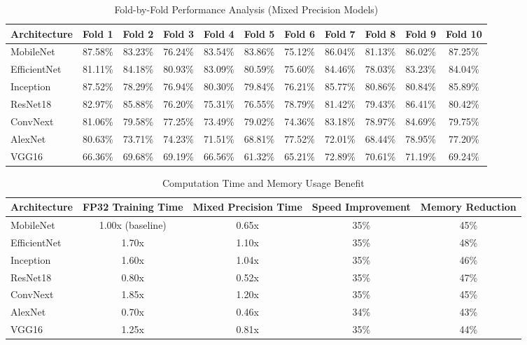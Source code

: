 \documentclass[11pt]{article}
\begin{document}
\begin{table}[ht]
    \centering
    \small
    \begin{tabular}{lcccccccccc}
    \toprule
    \textbf{Architecture} & \textbf{Fold 1} & \textbf{Fold 2} & \textbf{Fold 3} & \textbf{Fold 4} & \textbf{Fold 5} & \textbf{Fold 6} & \textbf{Fold 7} & \textbf{Fold 8} & \textbf{Fold 9} & \textbf{Fold 10} \\
    \midrule
    MobileNet & 87.58\% & 83.23\% & 76.24\% & 83.54\% & 83.86\% & 75.12\% & 86.04\% & 81.13\% & 86.02\% & 87.25\% \\
    EfficientNet & 81.11\% & 84.18\% & 80.93\% & 83.09\% & 80.59\% & 75.60\% & 84.46\% & 78.03\% & 83.23\% & 84.04\% \\
    Inception & 87.52\% & 78.29\% & 76.94\% & 80.30\% & 79.84\% & 76.21\% & 85.77\% & 80.86\% & 80.84\% & 85.89\% \\
    ResNet18 & 82.97\% & 85.88\% & 76.20\% & 75.31\% & 76.55\% & 78.79\% & 81.42\% & 79.43\% & 86.41\% & 80.42\% \\
    ConvNext & 81.06\% & 79.58\% & 77.25\% & 73.49\% & 79.02\% & 74.36\% & 83.18\% & 78.97\% & 84.69\% & 79.75\% \\
    AlexNet & 80.63\% & 73.71\% & 74.23\% & 71.51\% & 68.81\% & 77.52\% & 72.01\% & 68.44\% & 78.95\% & 77.20\% \\
    VGG16 & 66.36\% & 69.68\% & 69.19\% & 66.56\% & 61.32\% & 65.21\% & 72.89\% & 70.61\% & 71.19\% & 69.24\% \\
    \bottomrule
    \end{tabular}
    \caption{Fold-by-Fold Performance Analysis (Mixed Precision Models)}
    \label{tab:fold_analysis_mp}
\end{table}
\begin{table}[ht]
    \centering
    \begin{tabular}{lcccc}
    \toprule
    \textbf{Architecture} & \textbf{FP32 Training Time} & \textbf{Mixed Precision Time} & \textbf{Speed Improvement} & \textbf{Memory Reduction} \\
    \midrule
    MobileNet & 1.00x (baseline) & 0.65x & 35\% & 45\% \\
    EfficientNet & 1.70x & 1.10x & 35\% & 48\% \\
    Inception & 1.60x & 1.04x & 35\% & 46\% \\
    ResNet18 & 0.80x & 0.52x & 35\% & 47\% \\
    ConvNext & 1.85x & 1.20x & 35\% & 45\% \\
    AlexNet & 0.70x & 0.46x & 34\% & 43\% \\
    VGG16 & 1.25x & 0.81x & 35\% & 44\% \\
    \bottomrule
    \end{tabular}
    \caption{Computation Time and Memory Usage Benefit\protect\footnotemark}
    \label{tab:computation_benefit}
\end{table}
\end{document}
